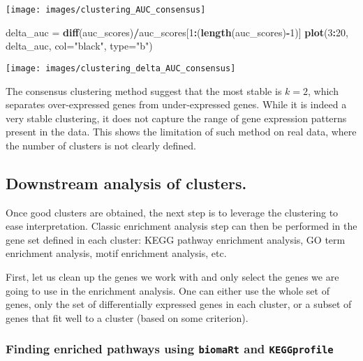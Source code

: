 \documentclass[9pt,a4paper,]{extarticle}
\newenvironment{Shaded}{\begin{snugshade}}{\end{snugshade}}
\newcommand{\DataTypeTok}[1]{\textcolor[rgb]{0.13,0.29,0.53}{#1}}
\newcommand{\DecValTok}[1]{\textcolor[rgb]{0.00,0.00,0.81}{#1}}
\newcommand{\KeywordTok}[1]{\textcolor[rgb]{0.13,0.29,0.53}{\textbf{#1}}}
\newcommand{\NormalTok}[1]{#1}
\newcommand{\OperatorTok}[1]{\textcolor[rgb]{0.81,0.36,0.00}{\textbf{#1}}}
\newcommand{\StringTok}[1]{\textcolor[rgb]{0.31,0.60,0.02}{#1}}
\begin{document}
\begin{center}\texttt{[image: images/clustering\_AUC\_consensus]} \end{center}

\begin{Shaded}
\begin{Highlighting}[]
\NormalTok{delta_auc =}\StringTok{ }\KeywordTok{diff}\NormalTok{(auc_scores)}\OperatorTok{/}\NormalTok{auc_scores[}\DecValTok{1}\OperatorTok{:}\NormalTok{(}\KeywordTok{length}\NormalTok{(auc_scores)}\OperatorTok{-}\DecValTok{1}\NormalTok{)]}
\KeywordTok{plot}\NormalTok{(}\DecValTok{3}\OperatorTok{:}\DecValTok{20}\NormalTok{, delta_auc, }\DataTypeTok{col=}\StringTok{"black"}\NormalTok{, }\DataTypeTok{type=}\StringTok{"b"}\NormalTok{)}
\end{Highlighting}
\end{Shaded}

\begin{center}\texttt{[image: images/clustering\_delta\_AUC\_consensus]} \end{center}

The consensus clustering method suggest that the most stable is \(k=2\), which
separates over-expressed genes from under-expressed genes. While it is indeed
a very stable clustering, it does not capture the range of gene expression
patterns present in the data. This shows the limitation of such method on real
data, where the number of clusters is not clearly defined.

\hypertarget{downstream-analysis-of-clusters.}{%
\subsection{Downstream analysis of clusters.}\label{downstream-analysis-of-clusters.}}

Once good clusters are obtained, the next step is to leverage the clustering
to ease interpretation. Classic enrichment analysis step can then be performed
in the gene set defined in each cluster: KEGG pathway enrichment analysis, GO
term enrichment analysis, motif enrichment analysis, etc.

First, let us clean up the genes we work with and only select the genes we are
going to use in the enrichment analysis. One can either use the whole set of
genes, only the set of differentially expressed genes in each cluster, or a
subset of genes that fit well to a cluster (based on some criterion).

\hypertarget{finding-enriched-pathways-using-biomart-and-keggprofile}{%
\subsubsection{\texorpdfstring{Finding enriched pathways using \texttt{biomaRt} and \texttt{KEGGprofile}}{Finding enriched pathways using biomaRt and KEGGprofile}}\label{finding-enriched-pathways-using-biomart-and-keggprofile}}
\end{document}
